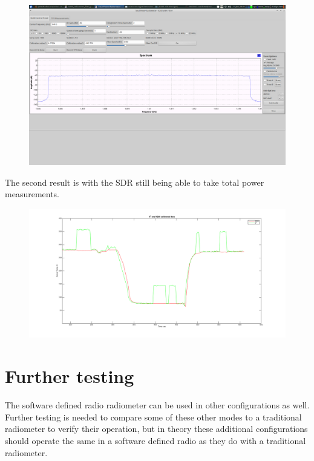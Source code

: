 \begin{figure}[h!tb] \centering

\includegraphics[width=\textwidth]{Images/interfering_signal_filter_on.png}

\label{filter_on}
\end{figure}

The second result is with the SDR still being able to take total power measurements. 

\begin{figure}[h!tb] \centering

\includegraphics[width=\textwidth]{Images/moneyshot.png}

\label{sdr_x2_filter}
\end{figure} 

\section{Further testing}
The software defined radio radiometer can be used in other configurations as well.  Further testing is needed to compare some of these other modes to a traditional radiometer to verify their operation, but in theory these additional configurations should operate the same in a software defined radio as they do with a traditional radiometer.